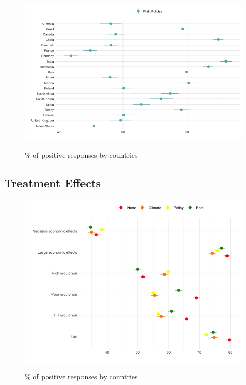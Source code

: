 \begin{frame}{}%
\begin{figure}[h!]
\caption{\% of positive responses by countries} %
\includegraphics[width=.7\paperwidth]{../figures/country_comparison/support_main_policies_by_country.png} \\
\end{figure}
\end{frame}

\subsection{Treatment Effects}

\begin{frame}{}%
\begin{figure}[h!]
\caption{\% of positive responses by countries} %
\includegraphics[width=.7\paperwidth]{../figures/country_comparison/attitudes_pol_by_country.png} \\
\end{figure}
\end{frame}

